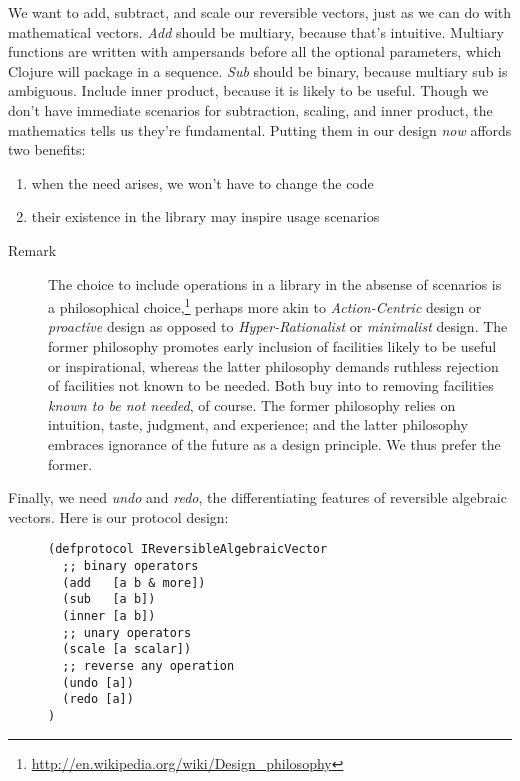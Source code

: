 \documentclass[11pt]{article}
\begin{document}
We want to add, subtract, and scale our reversible vectors, just as we
can do with mathematical vectors.  \emph{Add} should be multiary, because
that's intuitive. Multiary functions are written with ampersands
before all the optional parameters, which Clojure will package in a
sequence. \emph{Sub} should be binary, because multiary sub is
ambiguous. Include inner product, because it is likely to be useful.
Though we don't have immediate scenarios for subtraction, scaling, and
inner product, the mathematics tells us they're fundamental. Putting
them in our design \emph{now} affords two benefits:
\begin{enumerate}
\item when the need arises, we won't have to change the code
\item their existence in the library may inspire usage scenarios
\end{enumerate}



\begin{description}
\item[{Remark}] The choice to include operations in a library in the absense
of scenarios is a philosophical
choice,\footnote{\url{http://en.wikipedia.org/wiki/Design_philosophy}}
perhaps more akin to \emph{Action-Centric} design or \emph{proactive}
design as opposed to \emph{Hyper-Rationalist} or \emph{minimalist}
design. The former philosophy promotes early inclusion of
facilities likely to be useful or inspirational, whereas the
latter philosophy demands ruthless rejection of facilities
not known to be needed. Both buy into to removing facilities
\emph{known to be not needed}, of course. The former philosophy
relies on intuition, taste, judgment, and experience; and
the latter philosophy embraces ignorance of the future as a
design principle. We thus prefer the former.
\end{description}



Finally, we need \emph{undo} and \emph{redo}, the differentiating features of
reversible algebraic vectors. Here is our protocol design:

\begin{figure}[H]
\label{reversible-algebraic-vector-protocol}
\begin{verbatim}
(defprotocol IReversibleAlgebraicVector
  ;; binary operators
  (add   [a b & more])
  (sub   [a b])
  (inner [a b])
  ;; unary operators
  (scale [a scalar])
  ;; reverse any operation
  (undo [a])
  (redo [a])
)
\end{verbatim}
\end{figure}
\end{document}
